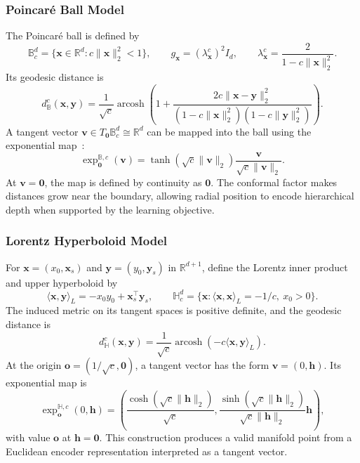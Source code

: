 \subsubsection{Poincar\'e Ball Model}
The Poincar\'e ball is defined by
\begin{equation}
 \mathbb{B}_c^d=\{\mathbf{x}\in\mathbb{R}^d:c\|\mathbf{x}\|_2^2<1\},
 \qquad g_{\mathbf{x}}=(\lambda_{\mathbf{x}}^c)^2 I_d,
 \qquad \lambda_{\mathbf{x}}^c=\frac{2}{1-c\|\mathbf{x}\|_2^2}.
 \label{eq:poincare-domain}
\end{equation}
Its geodesic distance is
\begin{equation}
 d_{\mathbb B}^c(\mathbf{x},\mathbf{y})=
 \frac{1}{\sqrt c}\operatorname{arcosh}\!\left(
 1+\frac{2c\|\mathbf{x}-\mathbf{y}\|_2^2}
 {(1-c\|\mathbf{x}\|_2^2)(1-c\|\mathbf{y}\|_2^2)}\right).
 \label{eq:poincare-distance}
\end{equation}
A tangent vector $\mathbf{v}\in T_{\mathbf{0}}\mathbb{B}_c^d\cong\mathbb{R}^d$ can be mapped into the ball using the exponential map~\cite{ganea2018hyperbolic}:
\begin{equation}
 \exp_{\mathbf{0}}^{\mathbb B,c}(\mathbf{v})=
 \tanh(\sqrt c\|\mathbf{v}\|_2)
 \frac{\mathbf{v}}{\sqrt c\|\mathbf{v}\|_2}.
 \label{eq:poincare-exp}
\end{equation}
At $\mathbf{v}=\mathbf{0}$, the map is defined by continuity as $\mathbf{0}$. The conformal factor makes distances grow near the boundary, allowing radial position to encode hierarchical depth when supported by the learning objective.

\subsubsection{Lorentz Hyperboloid Model}
For $\mathbf{x}=(x_0,\mathbf{x}_s)$ and $\mathbf{y}=(y_0,\mathbf{y}_s)$ in $\mathbb{R}^{d+1}$, define the Lorentz inner product and upper hyperboloid by
\begin{equation}
 \langle\mathbf{x},\mathbf{y}\rangle_L=-x_0y_0+\mathbf{x}_s^\top\mathbf{y}_s,
 \qquad
 \mathbb{H}_c^d=\{\mathbf{x}:\langle\mathbf{x},\mathbf{x}\rangle_L=-1/c,\ x_0>0\}.
 \label{eq:lorentz-domain}
\end{equation}
The induced metric on its tangent spaces is positive definite, and the geodesic distance is~\cite{nickel2018learning}
\begin{equation}
 d_{\mathbb H}^c(\mathbf{x},\mathbf{y})=
 \frac{1}{\sqrt c}\operatorname{arcosh}(-c\langle\mathbf{x},\mathbf{y}\rangle_L).
 \label{eq:lorentz-distance}
\end{equation}
At the origin $\mathbf{o}=(1/\sqrt c,\mathbf{0})$, a tangent vector has the form $\mathbf{v}=(0,\mathbf{h})$. Its exponential map is
\begin{equation}
 \exp_{\mathbf{o}}^{\mathbb H,c}(0,\mathbf{h})=
 \left(\frac{\cosh(\sqrt c\|\mathbf{h}\|_2)}{\sqrt c},
 \frac{\sinh(\sqrt c\|\mathbf{h}\|_2)}{\sqrt c\|\mathbf{h}\|_2}\mathbf{h}\right),
 \label{eq:lorentz-exp}
\end{equation}
with value $\mathbf{o}$ at $\mathbf{h}=\mathbf{0}$. This construction produces a valid manifold point from a Euclidean encoder representation interpreted as a tangent vector.

